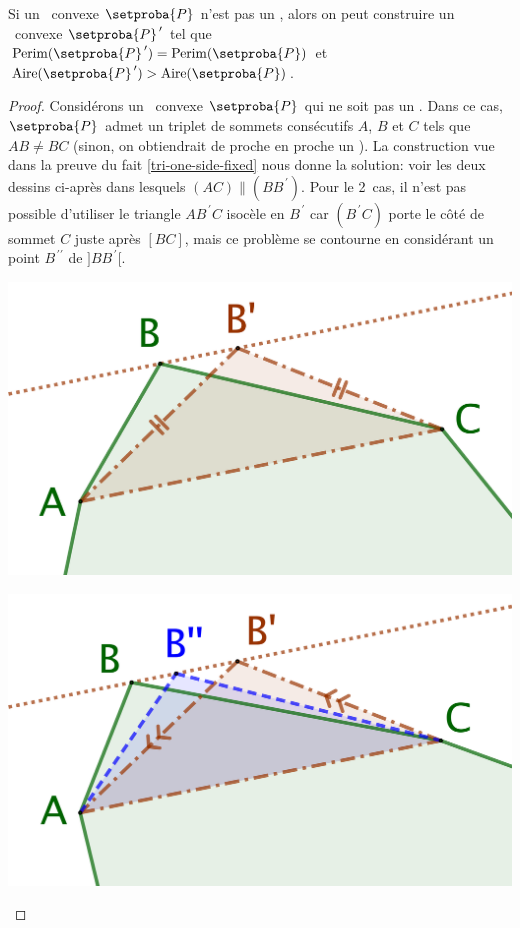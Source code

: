 

\begin{fact} \label{iso-poly} 
	Si un \ngone\ convexe $\setproba{P}$ n'est pas un \niso, alors on peut construire un \ngone\ convexe $\setproba{P}^{\,\prime}$ tel que 
	$\perim{\setproba{P}^{\,\prime}} = \perim{\setproba{P}}$ 
	et 
	$\area{\setproba{P}^{\,\prime}} > \area{\setproba{P}}$.
\end{fact}


\begin{proof}
	Considérons un \ngone\ convexe $\setproba{P}$ qui ne soit pas un \niso.
	Dans ce cas, $\setproba{P}$ admet un triplet de sommets consécutifs $A$, $B$ et $C$ tels que $AB \neq BC$ (sinon, on obtiendrait de proche en proche un \niso).
	La construction vue dans la preuve du fait \ref{tri-one-side-fixed} nous donne la solution: voir les deux dessins ci-après dans lesquels $(AC) \parallel (BB^{\,\prime})$. 
	Pour le 2\ieme\ cas, il n'est pas possible d'utiliser le triangle $AB^{\,\prime}C$ isocèle en $B^{\,\prime}$ car $(B^{\,\prime}C)$ porte le côté de sommet $C$ juste après $[BC]$, mais ce problème se contourne en considérant un point $B^{\,\prime\prime}$ de $]BB^{\,\prime}[$.
	\begin{multicols}{2}
		\centering

		\includegraphics[scale=.4]{content/polygon/not-iso-OK.png}

		\includegraphics[scale=.4]{content/polygon/not-iso-KO.png}
	\end{multicols}
	

\end{proof}
